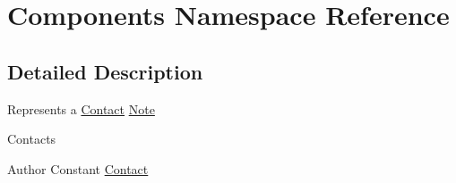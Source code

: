 \hypertarget{namespace_components}{\section{Components Namespace Reference}
\label{namespace_components}
}


\subsection{Detailed Description}
Represents a \hyperlink{interface_contact}{Contact} \hyperlink{interface_note}{Note}

Contacts \begin{DoxyAuthor}{Author}
Constant \hyperlink{interface_contact}{Contact} 
\end{DoxyAuthor}
